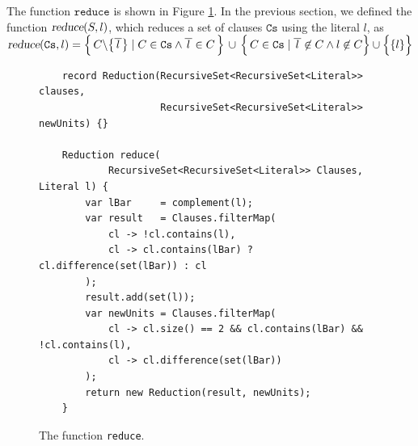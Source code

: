 The function $\texttt{reduce}$  is shown in Figure \ref{fig:reduce}.
In the previous section, we defined the function $\textsl{reduce}(S, l)$, which reduces a
set of clauses $\texttt{Cs}$ using the literal $l$, as
\\[0.2cm]
\hspace*{1.3cm}
$\textsl{reduce}(\texttt{Cs},l)  = 
 \Bigl\{\, C \backslash \bigl\{\overline{\,l\,}\bigr\} \;|\; C \in \texttt{Cs} \wedge \overline{\,l\,} \in C \,\Bigr\} 
       \,\cup\, \Bigl\{\, C \in \texttt{Cs} \mid \overline{\,l\,} \not\in C \wedge l \not\in C \Bigr\} \cup \Bigl\{\{l\}\Bigr\}
$
\\[0.2cm]
\begin{figure}[!ht]
  \centering
\begin{verbatim}
    record Reduction(RecursiveSet<RecursiveSet<Literal>> clauses,
                     RecursiveSet<RecursiveSet<Literal>> newUnits) {}

    Reduction reduce(
            RecursiveSet<RecursiveSet<Literal>> Clauses, Literal l) {
        var lBar     = complement(l);
        var result   = Clauses.filterMap(
            cl -> !cl.contains(l),
            cl -> cl.contains(lBar) ? cl.difference(set(lBar)) : cl
        );
        result.add(set(l));
        var newUnits = Clauses.filterMap(
            cl -> cl.size() == 2 && cl.contains(lBar) && !cl.contains(l),
            cl -> cl.difference(set(lBar))
        );
        return new Reduction(result, newUnits);
    }
\end{verbatim}
\vspace*{-0.3cm}
  \caption{The function \texttt{reduce}. }
  \label{fig:reduce}
\end{figure}
